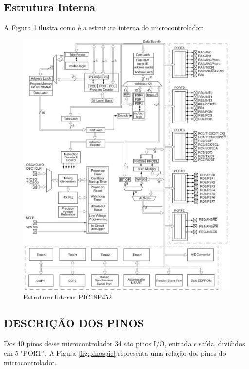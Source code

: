 \newpage 
\subsection{Estrutura Interna}
A Figura \ref{fig:estuturapic} ilustra como é a estrutura interna do microcontrolador:

\begin{figure}[htp]
	\centering
	\includegraphics[scale=0.6]{images/estrutura_pic.png}
	\caption{Estrutura Interna PIC18F452}	
	\label{fig:estuturapic}	
\end{figure}

\newpage 
\subsection{DESCRIÇÃO DOS PINOS}
Dos 40 pinos desse microcontrolador 34 são pinos I/O, entrada e saída, divididos em 5 "PORT". A Figura \ref{fig:pinospic} representa uma relação dos pinos do microcontrolador.

